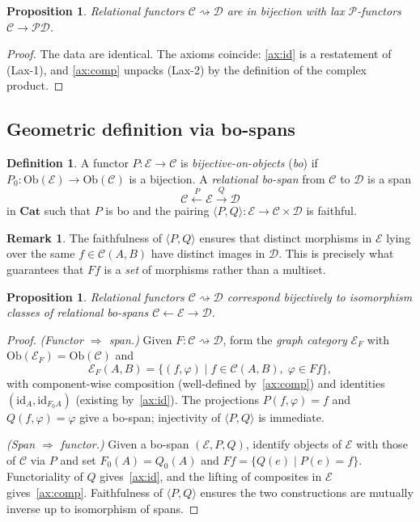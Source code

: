 \documentclass{article}
\theoremstyle{plain}
\newtheorem{proposition}[theorem]{Proposition}
\theoremstyle{definition}
\newtheorem{definition}[theorem]{Definition}
\newtheorem{remark}[theorem]{Remark}
\newcommand{\Ob}{\mathrm{Ob}}
\newcommand{\id}{\mathrm{id}}
\newcommand{\Cat}{\mathbf{Cat}}
\newcommand{\cP}{\mathcal{P}}
\newcommand{\cC}{\mathcal{C}}
\newcommand{\cD}{\mathcal{D}}
\newcommand{\cE}{\mathcal{E}}
\begin{document}
\begin{proposition}\label{prop:enriched}
Relational functors $\cC \rightsquigarrow \cD$ are in bijection with lax $\cP$-functors $\cC \to \cP\cD$.
\end{proposition}

\begin{proof}
The data are identical.  The axioms coincide: \ref{ax:id} is a restatement of (Lax-1), and \ref{ax:comp} unpacks (Lax-2) by the definition of the complex product.
\end{proof}

\subsection{Geometric definition via bo-spans}\label{ssec:bospan}

\begin{definition}\label{def:bospan}
A functor $P\colon \cE \to \cC$ is \emph{bijective-on-objects} (\emph{bo}) if $P_0\colon \Ob(\cE) \to \Ob(\cC)$ is a bijection.  A \emph{relational bo-span} from $\cC$ to $\cD$ is a span
\[
    \cC \xleftarrow{\;P\;} \cE \xrightarrow{\;Q\;} \cD
\]
in $\Cat$ such that $P$ is bo and the pairing $\langle P, Q \rangle \colon \cE \to \cC \times \cD$ is faithful.
\end{definition}

\begin{remark}\label{rmk:faithful}
The faithfulness of $\langle P, Q \rangle$ ensures that distinct morphisms in $\cE$ lying over the same $f \in \cC(A,B)$ have distinct images in $\cD$.  This is precisely what guarantees that $Ff$ is a \emph{set} of morphisms rather than a multiset.
\end{remark}

\begin{proposition}\label{prop:bospan}
Relational functors $\cC \rightsquigarrow \cD$ correspond bijectively to isomorphism classes of relational bo-spans $\cC \leftarrow \cE \to \cD$.
\end{proposition}

\begin{proof}
\textit{(Functor $\Rightarrow$ span.)}
Given $F\colon \cC \rightsquigarrow \cD$, form the \emph{graph category} $\cE_F$ with $\Ob(\cE_F) = \Ob(\cC)$ and
\[
    \cE_F(A,B) = \bigl\{(f,\varphi) \mid f \in \cC(A,B),\; \varphi \in Ff\bigr\},
\]
with component-wise composition (well-defined by~\ref{ax:comp}) and identities $(\id_A, \id_{F_0 A})$ (existing by~\ref{ax:id}).  The projections $P(f,\varphi)=f$ and $Q(f,\varphi)=\varphi$ give a bo-span; injectivity of $\langle P, Q\rangle$ is immediate.

\smallskip\noindent
\textit{(Span $\Rightarrow$ functor.)}
Given a bo-span $(\cE, P, Q)$, identify objects of $\cE$ with those of $\cC$ via $P$ and set $F_0(A) = Q_0(A)$ and $Ff = \{Q(e) \mid P(e) = f\}$.  Functoriality of $Q$ gives~\ref{ax:id}, and the lifting of composites in $\cE$ gives~\ref{ax:comp}.  Faithfulness of $\langle P,Q\rangle$ ensures the two constructions are mutually inverse up to isomorphism of spans.
\end{proof}
\end{document}
